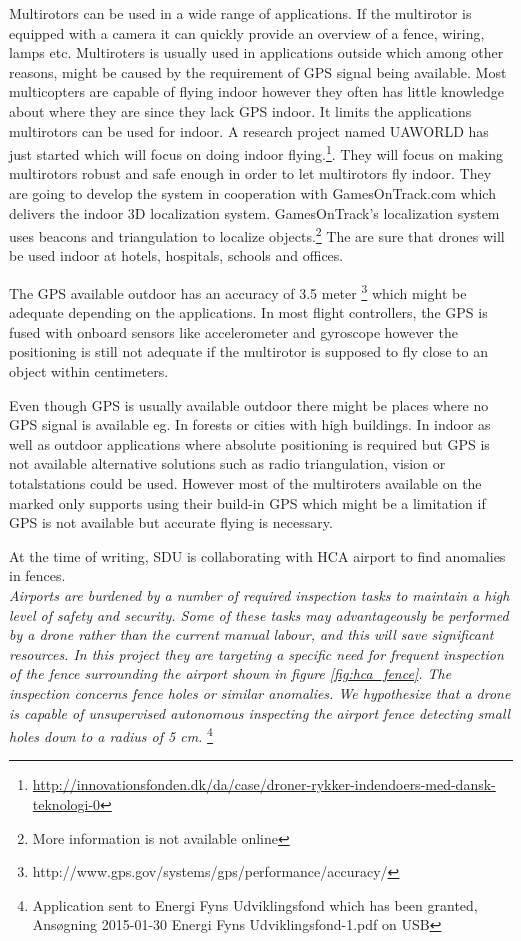 Multirotors can be used in a wide range of applications.
If the multirotor is equipped with a camera it can quickly provide an overview of a fence, wiring, lamps etc. Multiroters is usually used in applications outside which among other reasons, might be caused by the requirement of GPS signal being available.
Most multicopters are capable of flying indoor however they often has little knowledge about where they are since they lack GPS indoor. It limits the applications multirotors can be used for indoor. 
A research project named UAWORLD has just started which will focus on doing indoor flying.\footnote{\url{http://innovationsfonden.dk/da/case/droner-rykker-indendoers-med-dansk-teknologi-0}}. They will focus on making multirotors robust and safe enough in order to let multirotors fly indoor. They are going to develop the system in cooperation with GamesOnTrack.com which delivers the indoor 3D localization system. GamesOnTrack's localization system uses beacons and triangulation to localize objects.\footnote{More information is not available online} The are sure that drones will be used indoor at hotels, hospitals, schools and offices. 

The GPS available outdoor has an accuracy of 3.5 meter \footnote{http://www.gps.gov/systems/gps/performance/accuracy/} which might be adequate depending on the applications. In most flight controllers, the GPS is fused with onboard sensors like accelerometer and gyroscope however the positioning is still not adequate if the multirotor is supposed to fly close to an object within centimeters. 

Even though GPS is usually available outdoor there might be places where no GPS signal is available eg. In forests or cities with high buildings. 
In indoor as well as outdoor applications where absolute positioning is required but GPS is not available alternative solutions such as radio triangulation, vision or totalstations could be used. 
However most of the multiroters available on the marked only supports using their build-in GPS which might be a limitation if GPS is not available but accurate flying is necessary.


At the time of writing, SDU is collaborating with HCA airport to find anomalies in fences.\\ 
\textit{Airports are burdened by a number of required inspection tasks to maintain a high level of safety and security.
Some of these tasks may advantageously be performed by a drone rather than the current manual labour, and this will save significant resources.
In this project they are targeting a specific need for frequent inspection of the fence surrounding the airport shown in figure \ref{fig:hca_fence}. 
The inspection concerns fence holes or similar anomalies. We hypothesize that a drone is 
capable of unsupervised autonomous inspecting the airport fence detecting small holes down 
to a radius of 5 cm.} \footnote{Application sent to Energi Fyns Udviklingsfond which has been granted, Ansøgning 2015-01-30 Energi Fyns Udviklingsfond-1.pdf on USB}

